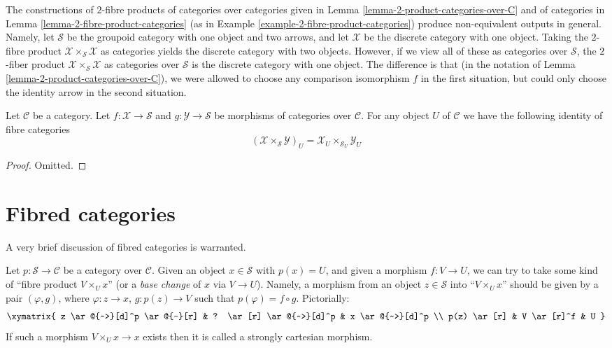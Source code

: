 \begin{example}
\label{example-different-2-fibre-products}
The constructions of $2$-fibre products of categories over categories given in
Lemma \ref{lemma-2-product-categories-over-C} and of categories in
Lemma \ref{lemma-2-fibre-product-categories}
(as in Example \ref{example-2-fibre-product-categories})
produce non-equivalent outputs in general.
Namely, let $\mathcal{S}$ be the groupoid category with one object and two
arrows, and let $\mathcal{X}$ be the discrete category with one object.
Taking the $2$-fibre product $\mathcal{X} \times_\mathcal{S} \mathcal{X}$
as categories yields the discrete category with two objects. However, if
we view all of these as categories over $\mathcal{S}$, the
$2$-fiber product $\mathcal{X} \times_\mathcal{S} \mathcal{X}$
as categories over $\mathcal{S}$ is the discrete category with one object.
The difference is that (in the notation of
Lemma \ref{lemma-2-product-categories-over-C}), we were allowed to choose
any comparison isomorphism $f$ in the first situation, but could only
choose the identity arrow in the second situation.
\end{example}

\begin{lemma}
\label{lemma-fibre-2-fibre-product-categories-over-C}
Let $\mathcal{C}$ be a category.
Let $f : \mathcal{X} \to \mathcal{S}$ and
$g : \mathcal{Y} \to \mathcal{S}$ be morphisms of categories over
$\mathcal{C}$. For any object $U$ of $\mathcal{C}$ we have
the following identity of
fibre categories
$$
\left(\mathcal{X} \times_\mathcal{S}\mathcal{Y}\right)_U
=
\mathcal{X}_U \times_{\mathcal{S}_U} \mathcal{Y}_U
$$
\end{lemma}

\begin{proof}
Omitted.
\end{proof}







\section{Fibred categories}
\label{section-fibred-categories}

\noindent
A very brief discussion of fibred categories is warranted.

\medskip\noindent
Let $p : \mathcal{S} \to \mathcal{C}$ be a category over $\mathcal{C}$.
Given an object $x \in \mathcal{S}$ with $p(x) = U$, and given a morphism
$f : V \to U$, we can try to take some kind of ``fibre product
$V \times_U x$'' (or a {\it base change} of $x$ via $V \to U$).
Namely, a morphism from an object $z \in \mathcal{S}$
into ``$V \times_U x$'' should be given by a pair
$(\varphi, g)$, where
$\varphi : z \to x$, $g : p(z) \to V$ such that
$p(\varphi) = f \circ g$. Pictorially:
$$
\xymatrix{
z \ar@{~>}[d]^p \ar@{-}[r] &
? \ar[r] \ar@{~>}[d]^p &
x \ar@{~>}[d]^p \\
p(z) \ar[r] & V \ar[r]^f & U
}
$$
If such a morphism $V \times_U x \to x$ exists then it is called
a strongly cartesian morphism.

